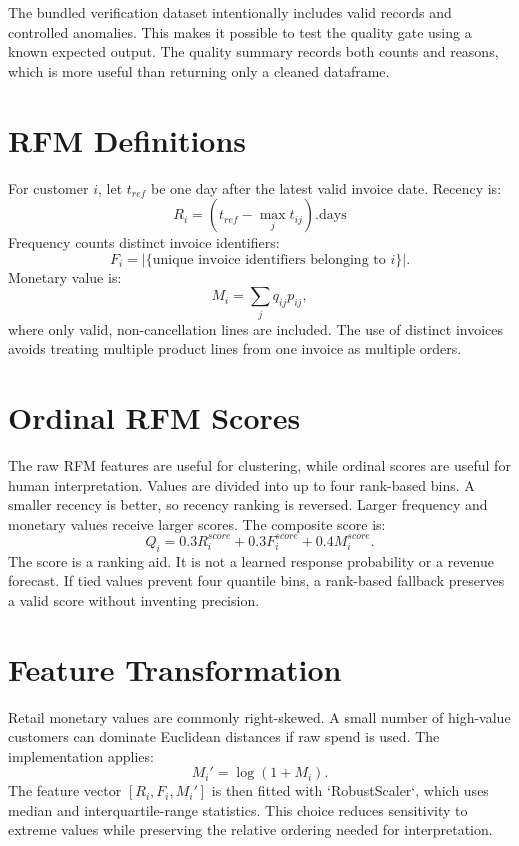 \documentclass[12pt,a4paper]{report}
\begin{document}
The bundled verification dataset intentionally includes valid records and controlled anomalies. This makes it possible to test the quality gate using a known expected output. The quality summary records both counts and reasons, which is more useful than returning only a cleaned dataframe.

\section{RFM Definitions}
For customer $i$, let $t_{ref}$ be one day after the latest valid invoice date. Recency is:
\begin{equation}
R_i = (t_{ref}-\max_j t_{ij}).\text{days}
\end{equation}
Frequency counts distinct invoice identifiers:
\begin{equation}
F_i = |\{\text{unique invoice identifiers belonging to }i\}|.
\end{equation}
Monetary value is:
\begin{equation}
M_i = \sum_j q_{ij}p_{ij},
\end{equation}
where only valid, non-cancellation lines are included. The use of distinct invoices avoids treating multiple product lines from one invoice as multiple orders.

\section{Ordinal RFM Scores}
The raw RFM features are useful for clustering, while ordinal scores are useful for human interpretation. Values are divided into up to four rank-based bins. A smaller recency is better, so recency ranking is reversed. Larger frequency and monetary values receive larger scores. The composite score is:
\begin{equation}
Q_i = 0.3R_i^{score}+0.3F_i^{score}+0.4M_i^{score}.
\end{equation}
The score is a ranking aid. It is not a learned response probability or a revenue forecast. If tied values prevent four quantile bins, a rank-based fallback preserves a valid score without inventing precision.

\section{Feature Transformation}
Retail monetary values are commonly right-skewed. A small number of high-value customers can dominate Euclidean distances if raw spend is used. The implementation applies:
\begin{equation}
M_i' = \log(1+M_i).
\end{equation}
The feature vector $[R_i,F_i,M_i']$ is then fitted with `RobustScaler`, which uses median and interquartile-range statistics. This choice reduces sensitivity to extreme values while preserving the relative ordering needed for interpretation.
\end{document}
